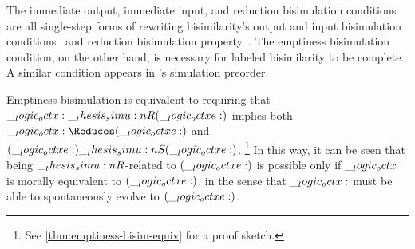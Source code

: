 The immediate output, immediate input, and reduction bisimulation conditions are all single-step forms of rewriting bisimilarity's output and input bisimulation conditions~ and reduction bisimulation property~.
The emptiness bisimulation condition, on the other hand, is necessary for labeled bisimilarity to be complete.
A similar condition appears in \citeauthor{Deng+:MSCS16}'s\autocite{Deng+:MSCS16} simulation preorder.

Emptiness bisimulation is equivalent to requiring that $\__logic_octx: \__thesis_simu:n {R} (\__logic_octxe:)$ implies both $\octx \Reduces (\octxe)$ and $(\__logic_octxe:) \__thesis_simu:n {S} (\__logic_octxe:)$.%
\footnote{See \cref{thm:emptiness-bisim-equiv} for a proof sketch.}
In this way, it can be seen that being $\__thesis_simu:n {R}$-related to $(\__logic_octxe:)$ is possible only if $\__logic_octx:$ is morally equivalent to $(\__logic_octxe:)$, in the sense that $\__logic_octx:$ must be able to spontaneously evolve to $(\__logic_octxe:)$.






